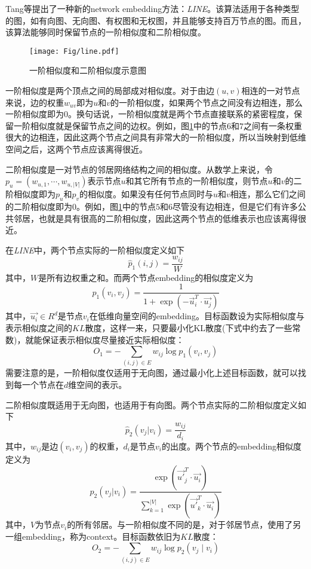 Tang等\cite{tang2015line}提出了一种新的network embedding方法：\emph{LINE}。该算法适用于各种类型的图，如有向图、无向图、有权图和无权图，并且能够支持百万节点的图。而且，该算法能够同时保留节点的一阶相似度和二阶相似度。

\begin{figure}[!htbp]
  \centering
  \texttt{[image: Fig/line.pdf]}
  \caption{一阶相似度和二阶相似度示意图\cite{tang2015line}}
  \label{fig:line}
\end{figure}

一阶相似度是两个顶点之间的局部成对相似度。对于由边$(u, v)$相连的一对节点来说，边的权重$w_{uv}$即为$u$和$v$的一阶相似度，如果两个节点之间没有边相连，那么一阶相似度即为0。换句话说，一阶相似度就是两个节点直接联系的紧密程度，保留一阶相似度就是保留节点之间的边权。例如，图\ref{fig:line}中的节点$6$和$7$之间有一条权重很大的边相连，因此这两个节点之间具有非常大的一阶相似度，所以当映射到低维空间之后，这两个节点应该离得很近。

二阶相似度是一对节点的邻居网络结构之间的相似度。从数学上来说，令$p_u=(w_{u, 1}, \cdots, w_{u,|V|})$表示节点$u$和其它所有节点的一阶相似度，则节点$u$和$v$的二阶相似度即为$p_u$和$p_v$的相似度。如果没有任何节点同时与$u$和$v$相连，那么它们之间的二阶相似度即为0。例如，图\ref{fig:line}中的节点$5$和$6$尽管没有边相连，但是它们有许多公共邻居，也就是具有很高的二阶相似度，因此这两个节点的低维表示也应该离得很近。

在\emph{LINE}中，两个节点实际的一阶相似度定义如下
\[\hat{p}_1(i, j) = \frac{w_{ij}}{W}\]
其中，$W$是所有边权重之和。而两个节点embedding的相似度定义为
\[p_1(v_i, v_j) = \frac{1}{1+ \exp(-\stackrel{\rightarrow}{u}_i^T\cdot \stackrel{\rightarrow}{u_j})}\]
其中，$\stackrel{\rightarrow}{u_i}\in R^d$是节点$v_i$在低维向量空间的embedding。目标函数设为实际相似度与表示相似度之间的$KL$散度，这样一来，只要最小化KL散度(下式中约去了一些常数)，就能保证表示相似度尽量接近实际相似度：
\[O_1 = -\sum_{(i, j)\in E}w_{ij}\log p_1(v_i, v_j)\]
需要注意的是，一阶相似度仅适用于无向图，通过最小化上述目标函数，就可以找到每一个节点在$d$维空间的表示。

二阶相似度既适用于无向图，也适用于有向图。两个节点实际的二阶相似度定义如下
\[\hat{p}_2(v_j|v_i) = \frac{w_{ij}}{d_i}\]
其中，$w_{ij}$是边$(v_i, v_j)$的权重，$d_i$是节点$v_i$的出度。两个节点的embedding相似度定义为
\[p_2(v_j|v_i) = \frac{\exp(\stackrel{\rightarrow}{u'}_j^T\cdot \stackrel{\rightarrow}{u_i})}{\sum_{k=1}^{|V|}\exp(\stackrel{\rightarrow}{u'}_k^T\cdot \stackrel{\rightarrow}{u_i})}\]
其中，$V$为节点$v_i$的所有邻居。与一阶相似度不同的是，对于邻居节点，使用了另一组embedding，称为context。目标函数依旧为$KL$散度：
\[O_2 = -\sum_{(i, j)\in E}w_{ij}\log p_2(v_j\mid v_i)\]


